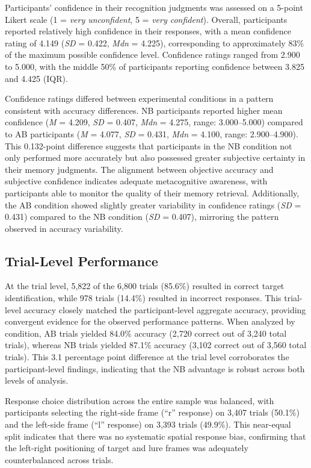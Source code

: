 Participants' confidence in their recognition judgments was assessed on a 5-point Likert scale (1 = \textit{very unconfident}, 5 = \textit{very confident}). Overall, participants reported relatively high confidence in their responses, with a mean confidence rating of 4.149 (\textit{SD} = 0.422, \textit{Mdn} = 4.225), corresponding to approximately 83\% of the maximum possible confidence level. Confidence ratings ranged from 2.900 to 5.000, with the middle 50\% of participants reporting confidence between 3.825 and 4.425 (IQR).

Confidence ratings differed between experimental conditions in a pattern consistent with accuracy differences. NB participants reported higher mean confidence (\textit{M} = 4.209, \textit{SD} = 0.407, \textit{Mdn} = 4.275, range: 3.000--5.000) compared to AB participants (\textit{M} = 4.077, \textit{SD} = 0.431, \textit{Mdn} = 4.100, range: 2.900--4.900). This 0.132-point difference suggests that participants in the NB condition not only performed more accurately but also possessed greater subjective certainty in their memory judgments. The alignment between objective accuracy and subjective confidence indicates adequate metacognitive awareness, with participants able to monitor the quality of their memory retrieval. Additionally, the AB condition showed slightly greater variability in confidence ratings (\textit{SD} = 0.431) compared to the NB condition (\textit{SD} = 0.407), mirroring the pattern observed in accuracy variability.

\subsection{Trial-Level Performance}

At the trial level, 5,822 of the 6,800 trials (85.6\%) resulted in correct target identification, while 978 trials (14.4\%) resulted in incorrect responses. This trial-level accuracy closely matched the participant-level aggregate accuracy, providing convergent evidence for the observed performance patterns. When analyzed by condition, AB trials yielded 84.0\% accuracy (2,720 correct out of 3,240 total trials), whereas NB trials yielded 87.1\% accuracy (3,102 correct out of 3,560 total trials). This 3.1 percentage point difference at the trial level corroborates the participant-level findings, indicating that the NB advantage is robust across both levels of analysis.

Response choice distribution across the entire sample was balanced, with participants selecting the right-side frame (``r'' response) on 3,407 trials (50.1\%) and the left-side frame (``l'' response) on 3,393 trials (49.9\%). This near-equal split indicates that there was no systematic spatial response bias, confirming that the left-right positioning of target and lure frames was adequately counterbalanced across trials.

